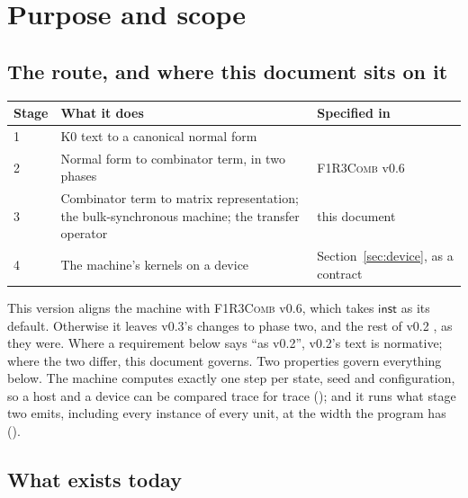 \documentclass[11pt,a4paper]{article}
\newcommand{\Comb}{\textsc{F1R3Comb}}
\theoremstyle{definition}
\theoremstyle{plain}
\newcommand{\inst}{\mathsf{inst}}
\begin{document}
\tableofcontents

\section{Purpose and scope}\label{sec:purpose}

\subsection{The route, and where this document sits on it}

\begin{center}
\begin{tabularx}{\linewidth}{@{}l>{\raggedright\arraybackslash}Xl@{}}
\toprule
Stage & What it does & Specified in\\
\midrule
1 & K0 text to a canonical normal form & \cite{k1ndl1ng}\\
2 & Normal form to combinator term, in two phases & \Comb{} v0.6 \cite{combspec}\\
3 & Combinator term to matrix representation; the bulk-synchronous machine;
    the transfer operator & this document\\
4 & The machine's kernels on a device & Section~\ref{sec:device}, as a
    contract\\
\bottomrule
\end{tabularx}
\end{center}

\noindent
This version aligns the machine with \Comb{} v0.6, which takes $\inst$ as
its default. Otherwise it leaves v0.3's changes to phase two, and the rest of
v0.2 \cite{matv02}, as they were. Where a requirement below says ``as
v0.2'', v0.2's text is normative; where the two differ, this document
governs. Two properties govern everything below. The machine computes exactly one step
per state, seed and configuration, so a host and a device can be compared
trace for trace (\cite[P4]{matnote}); and it runs what stage two emits,
including every instance of every unit, at the width the program has
(\cite[Princ.~10.4]{matnote}).

\subsection{What exists today}
\end{document}
